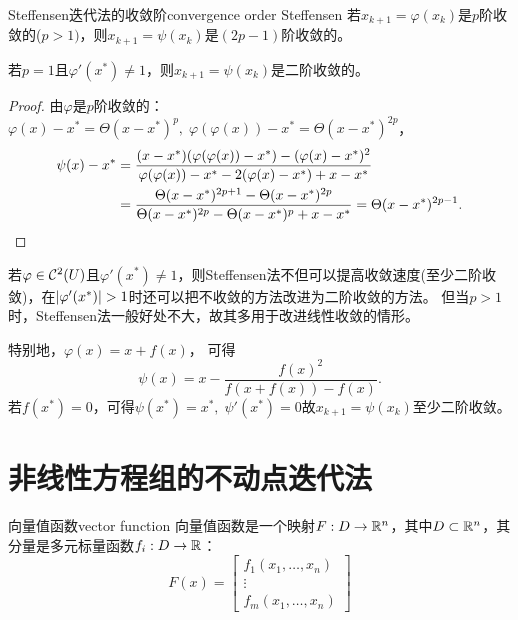 \begin{theorem}
    {Steffensen迭代法的收敛阶}{convergence order Steffensen}
    若$x_{k+1} = \varphi(x_k)$是$p$阶收敛的($p > 1)$，则$x_{k+1} = \psi(x_k)$是$(2p - 1)$阶收敛的。

    若$p = 1$且$\varphi'(x^*) \neq 1$，则$x_{k+1} = \psi(x_k)$是二阶收敛的。
\end{theorem}

\begin{proof}
    由$\varphi$是$p$阶收敛的：$\varphi(x) - x^* = \Theta(x - x^*)^p,\;\varphi(\varphi(x)) - x^* = \Theta(x - x^*)^{2p}$，
    \begin{align*}
        \psi(x) - x^* &= \frac{(x - x^*)(\varphi(\varphi(x)) - x^*) - (\varphi(x) - x^*)^2}{\varphi(\varphi(x)) - x^* - 2(\varphi(x) - x^*) + x - x^*}\\
        &= \frac{\Theta(x - x^*)^{2p+1} - \Theta(x - x^*)^{2p}}{\Theta(x - x^*)^{2p} - \Theta(x - x^*)^p + x - x^*} = \Theta(x - x^*)^{2p-1}.
        \qedhere
    \end{align*}
\end{proof}

\begin{remark}
    若$\varphi \in \mathcal{C}^2(U)$且$\varphi'(x^*) \neq 1$，则Steffensen法不但可以提高收敛速度(至少二阶收敛)，在$\lvert\varphi'(x^*)\rvert > 1$时还可以把不收敛的方法改进为二阶收敛的方法。
    但当$p > 1$时，Steffensen法一般好处不大，故其多用于改进线性收敛的情形。
\end{remark}

\begin{example}
    {}{}
    特别地，$\varphi(x) = x + f(x)$，
    可得
    \begin{equation}
        \psi(x) = x - \frac{f(x)^2}{f(x + f(x)) - f(x)}.
    \end{equation}
    若$f(x^*) = 0$，可得$\psi(x^*) = x^*,\;\psi'(x^*) = 0$故$x_{k+1} = \psi(x_k)$至少二阶收敛。
\end{example}

\section{非线性方程组的不动点迭代法}

\begin{definition}
    {向量值函数}{vector function}
    向量值函数是一个映射$F:D \to \mathbb{R}^n$，其中$D \subset \mathbb{R}^n$，其分量是多元标量函数$f_i:D \to \mathbb{R}$：
    \begin{equation}
        F(x) = \begin{bmatrix}
            f_1(x_1,\ldots,x_n)\\\vdots\\f_m(x_1,\ldots,x_n)
        \end{bmatrix}
    \end{equation}
\end{definition}

